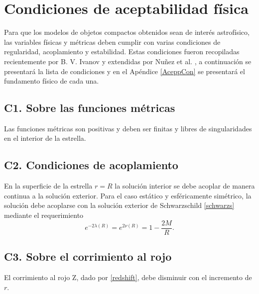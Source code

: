 



\section{Condiciones de aceptabilidad física}\label{phyacep}
Para que los modelos de objetos compactos obtenidos sean de interés astrofísico, las variables físicas y métricas deben cumplir con varias condiciones de regularidad, acoplamiento y estabilidad. Estas condiciones fueron recopiladas recientemente por B. V. Ivanov \cite{Ivanov2017} y extendidas por Nuñez et al. \cite{Hernandez2018}, a continuación se presentará la lista de condiciones y en el Apéndice \ref{AceppCon} se presentará el fundamento físico de cada una.

\subsection*{C1. Sobre las funciones métricas}
Las funciones métricas son positivas y deben ser finitas y libres de singularidades en el interior de la estrella.

\subsection*{C2. Condiciones de acoplamiento}
En la superficie de la estrella $r=R$ la solución interior se debe acoplar de manera continua a la solución exterior. Para el caso estático y esféricamente simétrico, la solución debe acoplarse con la solución exterior de Schwarzschild \eqref{schwarzs} mediante el requerimiento
\begin{equation}
     e ^ { -2 \lambda(R) } =  e ^ {  2 \nu(R) } =  1 - \frac { 2 M } { R }.
\end{equation}

\subsection*{C3. Sobre el corrimiento al rojo}
El corrimiento al rojo Z, dado por \eqref{redshift}, debe disminuir con el incremento de $r$.

